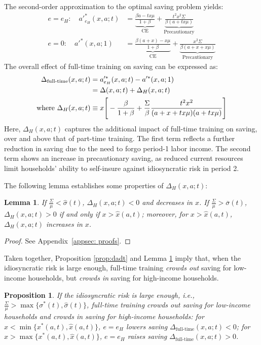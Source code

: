 \documentclass[12pt]{article}
\newtheorem{proposition}{Proposition}
\newtheorem{lemma}{Lemma}
\begin{document}
The second-order approximation to the optimal saving problem yields:
\begin{align}
    e = e_H: \quad a'^*_{e_H}(x,a;t) &= \underbrace{\frac{\beta a - t x \mu}{1+\beta}}_{\text{CE}} + \underbrace{\frac{t^2 x^2 \Sigma}{\beta(a + t x \mu)}}_{\text{Precautionary}} \\
    e = 0: \quad a'^*(x,a;1) &= \underbrace{\frac{\beta(a + x) - x \mu}{1+\beta}}_{\text{CE}} + \underbrace{\frac{x^2 \Sigma}{\beta(a + x + x \mu)}}_{\text{Precautionary}}
\end{align} 
The overall effect of full-time training on saving can be expressed as:
\begin{align}
    \Delta_{\text{full-time}}(x,a;t) &= a'^*_{e_H}(x,a;t) - a'^*(x,a;1) \notag \\
    &= \Delta(x,a;t) + \Delta_H(x,a;t) \\
    \text{where } \Delta_H(x,a;t) &\equiv x \Bigg[ -\frac{\beta}{1+\beta} + \frac{\Sigma}{\beta} \frac{t^2 x^2}{(a + x + t x \mu)(a + t x \mu)} \Bigg] \label{eq:dadt_fulltime}
\end{align}
Here, $\Delta_H(x,a;t)$ captures the additional impact of full-time training on saving, over and above that of part-time training. The first term reflects a further reduction in saving due to the need to forgo period-1 labor income. The second term shows an increase in precautionary saving, as reduced current resources limit households’ ability to self-insure against idiosyncratic risk in period 2.

The following lemma establishes some properties of $\Delta_H(x,a;t)$:
\begin{lemma}\label{lem:fulltime}
    If $\frac{\Sigma}{\mu}<\hat{\sigma}(t)$, $\Delta_H(x,a;t)<0$ and decreases in $x$. If $\frac{\Sigma}{\mu}>\overline{\sigma}(t)$, $\Delta_H(x,a;t)>0$ if and only if $x>\hat{x}(a,t)$; moreover, for $x>\hat{x}(a,t)$, $\Delta_H(x,a;t)$ increases in $x$.
\end{lemma}
\begin{proof}
    See Appendix~\ref{appsec: proofs}.
\end{proof}

\noindent Taken together, Proposition \ref{prop:dadt} and Lemma \ref{lem:fulltime} imply that, when the idiosyncratic risk is large enough, full-time training \textit{crowds out} saving for low-income households, but \textit{crowds in} saving for high-income households.
\begin{proposition}\label{prop:fulltime}
If the idiosyncratic risk is large enough, i.e., $\frac{\Sigma}{\mu}>\max\{\sigma^*(t),\hat{\sigma}(t)\}$, full-time training crowds out saving for low-income households and crowds in saving for high-income households: 
    for $x<\min\{x^*(a,t),\hat{x}(a,t)\}$, $e=e_H$ lowers saving $\Delta_{\text{full-time}}(x,a;t)<0$; for $x>\max\{x^*(a,t),\hat{x}(a,t)\}$, $e=e_H$ raises saving $\Delta_{\text{full-time}}(x,a;t)>0$.
\end{proposition}
\end{document}
